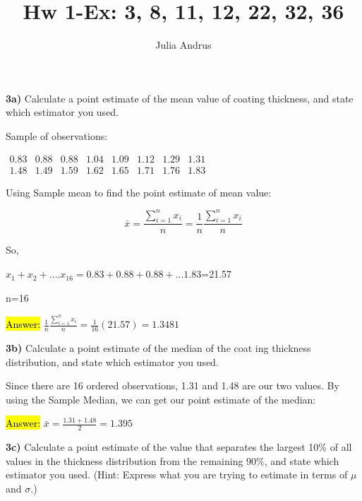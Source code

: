 \documentclass{article}
\title{Hw 1-Ex: 3, 8, 11, 12, 22, 32, 36}
\author{Julia Andrus}
\date{}
\begin{document}
\maketitle
\textbf{3a)} Calculate a point estimate of the mean value of coating thickness, and state which estimator you used.

\vspace{2mm}
Sample of observations: 

\vspace{5mm}

$\begin{matrix}
0.83 & 0.88 & 0.88 & 1.04 & 1.09 &1.12 & 1.29 & 1.31 \\

1.48 & 1.49 & 1.59 & 1.62 & 1.65 & 1.71 & 1.76 & 1.83
\end{matrix}$

\vspace{5mm}

Using Sample mean to find the point estimate of mean value: 

 
$$\bar{x} =\frac{\sum_{ i=1}^{n} x_{i}}n =\frac{1}n \frac{\sum_{ i=1}^{n} x_{i}}n$$

 
 So,
 
 
 
 $x_{1}+x_{2}+....x_{16}=0.83+0.88+0.88+...1.83$=21.57
 
 
 n=16
 \vspace{5mm}
 
 
 \hl{Answer:} $ \frac{1}n \frac{\sum_{ i=1}^{n} x_{i}}n=\frac{1}{16} (21.57)=1.3481$
 
 \vspace{2mm}

  
 \textbf{3b)} Calculate a point estimate of the median of the coat­ ing thickness distribution, and state which estimator you used. 
 
 \vspace{5mm}
 
 Since there are 16 ordered observations, 1.31 and 1.48 are our two values. By using the Sample Median, we can  get our point estimate of the median:
 
  \vspace{5mm}

\hl{Answer:} $\bar{x}=\frac{1.31+1.48} 2=1.395$
\vspace{5mm}

\textbf{3c)} Calculate a point estimate of the value that separates the
largest 10\% of all values in the thickness distribution from the remaining 90\%, and state which estimator you used. (Hint: Express what you are trying to estimate in terms of $\mu$ and $\sigma$.)
  \vspace{5mm}
  
\end{document}
